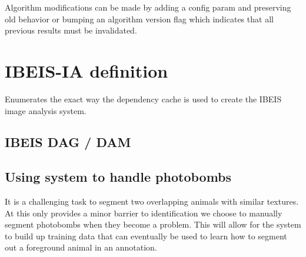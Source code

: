             Algorithm modifications can be made by adding a config
              param and preserving old behavior or bumping an algorithm
              version flag which indicates that all previous results
              must be invalidated.



    \section{IBEIS-IA definition}\label{sec:ibeisdepc}

        Enumerates the exact way the dependency cache is used to
          create the IBEIS image analysis system.

        \subsection{IBEIS DAG / DAM}
        \begin{comment}
        python -m ibeis.control.IBEISControl --test-show_depc_graph --save figures5/digraph.png --dpath ~/latex/crall-candidacy-2015/ --diskshow --clipwhite --reduced --dpi=120

        python -m ibeis.control.IBEISControl --test-show_depc_graph --save figures5/digraph.png --dpath ~/latex/crall-candidacy-2015/
        \end{comment}
        \digraph{}


        \subsection{Using system to handle photobombs}

            It is a challenging task to segment two overlapping
              animals with similar textures.
            At this only provides a minor barrier to identification we
              choose to manually segment photobombs when they become a
              problem.
            This will allow for the system to build up training data
              that can eventually be used to learn how to segment out a
              foreground animal in an annotation.

